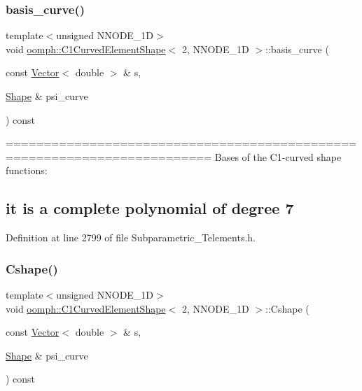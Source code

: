 \subsubsection{\texorpdfstring{basis\+\_\+curve()}{basis\_curve()}}
{\footnotesize\ttfamily template$<$unsigned N\+N\+O\+D\+E\+\_\+1D$>$ \\
void \hyperlink{classoomph_1_1C1CurvedElementShape}{oomph\+::\+C1\+Curved\+Element\+Shape}$<$ 2, N\+N\+O\+D\+E\+\_\+1D $>$\+::basis\+\_\+curve (\begin{DoxyParamCaption}\item[{const \hyperlink{classoomph_1_1Vector}{Vector}$<$ double $>$ \&}]{s,  }\item[{\hyperlink{classoomph_1_1Shape}{Shape} \&}]{psi\+\_\+curve }\end{DoxyParamCaption}) const\hspace{0.3cm}{\ttfamily [inline]}}

========================================================================= Bases of the C1-\/curved shape functions\+: \subsection*{it is a complete polynomial of degree 7 }

Definition at line 2799 of file Subparametric\+\_\+\+Telements.\+h.

\mbox{\label{classoomph_1_1C1CurvedElementShape_3_012_00_01NNODE__1D_01_4_a3f5542eebff8cce73b2a6cd0487fa9b7}} 
\subsubsection{\texorpdfstring{Cshape()}{Cshape()}}
{\footnotesize\ttfamily template$<$unsigned N\+N\+O\+D\+E\+\_\+1D$>$ \\
void \hyperlink{classoomph_1_1C1CurvedElementShape}{oomph\+::\+C1\+Curved\+Element\+Shape}$<$ 2, N\+N\+O\+D\+E\+\_\+1D $>$\+::Cshape (\begin{DoxyParamCaption}\item[{const \hyperlink{classoomph_1_1Vector}{Vector}$<$ double $>$ \&}]{s,  }\item[{\hyperlink{classoomph_1_1Shape}{Shape} \&}]{psi\+\_\+curve }\end{DoxyParamCaption}) const\hspace{0.3cm}{\ttfamily [inline]}}

